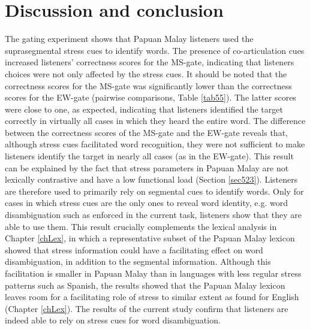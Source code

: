 \section{Discussion and conclusion}
The gating experiment shows that Papuan Malay listeners used the suprasegmental stress cues to identify words. The presence of co-articulation cues increased listeners’ correctness scores for the MS-gate, indicating that listeners choices were not only affected by the stress cues. It should be noted that the correctness scores for the MS-gate was significantly lower than the correctness scores for the EW-gate (pairwise comparisons, Table \ref{tab55}). The latter scores were close to one, as expected, indicating that listeners identified the target correctly in virtually all cases in which they heard the entire word. The difference between the correctness scores of the MS-gate and the EW-gate reveals that, although stress cues facilitated word recognition, they were not sufficient to make listeners identify the target in nearly all cases (as in the EW-gate). This result can be explained by the fact that stress parameters in Papuan Malay are not lexically contrastive and have a low functional load (Section \ref{sec523}). Listeners are therefore used to primarily rely on segmental cues to identify words. Only for cases in which stress cues are the only ones to reveal word identity, e.g. word disambiguation such as enforced in the current task, listeners show that they are able to use them. This result crucially complements the lexical analysis in Chapter \ref{chLex}, in which a representative subset of the Papuan Malay lexicon showed that stress information could have a facilitating effect on word disambiguation, in addition to the segmental information. Although this facilitation is smaller in Papuan Malay than in languages with less regular stress patterns such as Spanish, the results showed that the Papuan Malay lexicon leaves room for a facilitating role of stress to similar extent as found for English (Chapter \ref{chLex}). The results of the current study confirm that listeners are indeed able to rely on stress cues for word disambiguation.\par

